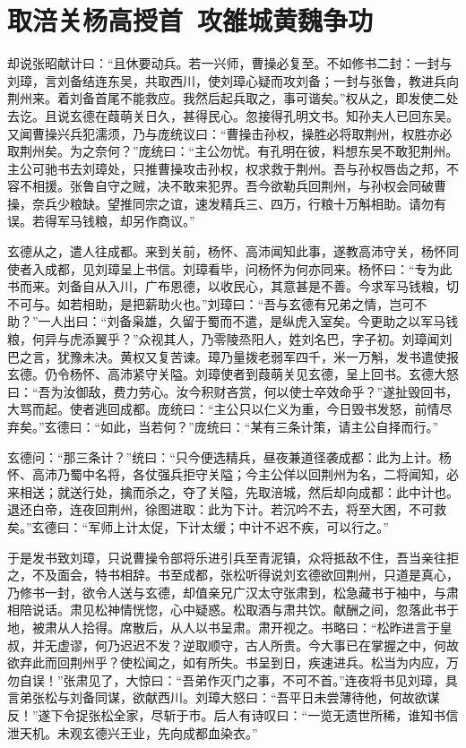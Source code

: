\chapter{取涪关杨高授首~攻雒城黄魏争功}

却说张昭献计曰：“且休要动兵。若一兴师，曹操必复至。不如修书二封：一封与刘璋，言刘备结连东吴，共取西川，使刘璋心疑而攻刘备；一封与张鲁，教进兵向荆州来。着刘备首尾不能救应。我然后起兵取之，事可谐矣。”权从之，即发使二处去讫。且说玄德在葭萌关日久，甚得民心。忽接得孔明文书。知孙夫人已回东吴。又闻曹操兴兵犯濡须，乃与庞统议曰：“曹操击孙权，操胜必将取荆州，权胜亦必取荆州矣。为之奈何？”庞统曰：“主公勿忧。有孔明在彼，料想东吴不敢犯荆州。主公可驰书去刘璋处，只推曹操攻击孙权，权求救于荆州。吾与孙权唇齿之邦，不容不相援。张鲁自守之贼，决不敢来犯界。吾今欲勒兵回荆州，与孙权会同破曹操，奈兵少粮缺。望推同宗之谊，速发精兵三、四万，行粮十万斛相助。请勿有误。若得军马钱粮，却另作商议。”

玄德从之，遣人往成都。来到关前，杨怀、高沛闻知此事，遂教高沛守关，杨怀同使者入成都，见刘璋呈上书信。刘璋看毕，问杨怀为何亦同来。杨怀曰：“专为此书而来。刘备自从入川，广布恩德，以收民心，其意甚是不善。今求军马钱粮，切不可与。如若相助，是把薪助火也。”刘璋曰：“吾与玄德有兄弟之情，岂可不助？”一人出曰：“刘备枭雄，久留于蜀而不遣，是纵虎入室矣。今更助之以军马钱粮，何异与虎添翼乎？”众视其人，乃零陵烝阳人，姓刘名巴，字子初。刘璋闻刘巴之言，犹豫未决。黄权又复苦谏。璋乃量拨老弱军四千，米一万斛，发书遣使报玄德。仍令杨怀、高沛紧守关隘。刘璋使者到葭萌关见玄德，呈上回书。玄德大怒曰：“吾为汝御敌，费力劳心。汝今积财吝赏，何以使士卒效命乎？”遂扯毁回书，大骂而起。使者逃回成都。庞统曰：“主公只以仁义为重，今日毁书发怒，前情尽弃矣。”玄德曰：“如此，当若何？”庞统曰：“某有三条计策，请主公自择而行。”

玄德问：“那三条计？”统曰：“只今便选精兵，昼夜兼道径袭成都：此为上计。杨怀、高沛乃蜀中名将，各仗强兵拒守关隘；今主公佯以回荆州为名，二将闻知，必来相送；就送行处，擒而杀之，夺了关隘，先取涪城，然后却向成都：此中计也。退还白帝，连夜回荆州，徐图进取：此为下计。若沉吟不去，将至大困，不可救矣。”玄德曰：“军师上计太促，下计太缓；中计不迟不疾，可以行之。”

于是发书致刘璋，只说曹操令部将乐进引兵至青泥镇，众将抵敌不住，吾当亲往拒之，不及面会，特书相辞。书至成都，张松听得说刘玄德欲回荆州，只道是真心，乃修书一封，欲令人送与玄德，却值亲兄广汉太守张肃到，松急藏书于袖中，与肃相陪说话。肃见松神情恍惚，心中疑惑。松取酒与肃共饮。献酬之间，忽落此书于地，被肃从人拾得。席散后，从人以书呈肃。肃开视之。书略曰：“松昨进言于皇叔，并无虚谬，何乃迟迟不发？逆取顺守，古人所贵。今大事已在掌握之中，何故欲弃此而回荆州乎？使松闻之，如有所失。书呈到日，疾速进兵。松当为内应，万勿自误！”张肃见了，大惊曰：“吾弟作灭门之事，不可不首。”连夜将书见刘璋，具言弟张松与刘备同谋，欲献西川。刘璋大怒曰：“吾平日未尝薄待他，何故欲谋反！”遂下令捉张松全家，尽斩于市。后人有诗叹曰：“一览无遗世所稀，谁知书信泄天机。未观玄德兴王业，先向成都血染衣。”

